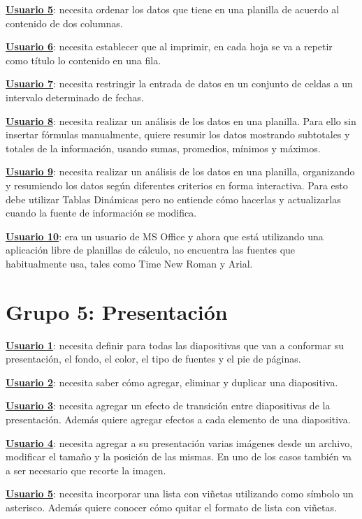 \documentclass[12pt]{article}
\begin{document}
\textbf{\underline{Usuario 5}}: necesita ordenar los datos que tiene en una planilla de acuerdo al contenido de dos columnas.

\textbf{\underline{Usuario 6}}: necesita establecer que al imprimir, en cada hoja se va a repetir como título lo contenido en una fila. 

\textbf{\underline{Usuario 7}}: necesita restringir la entrada de datos en un conjunto de celdas a un intervalo determinado de fechas.

\textbf{\underline{Usuario 8}}: necesita realizar un análisis de los datos en una planilla. Para ello sin insertar fórmulas manualmente, quiere resumir los datos mostrando subtotales y  totales de la información, usando sumas, promedios, mínimos y máximos.

\textbf{\underline{Usuario 9}}: necesita realizar un análisis de los datos en una planilla, organizando y resumiendo los datos según diferentes criterios en forma interactiva. Para esto debe utilizar Tablas Dinámicas pero no entiende cómo hacerlas y actualizarlas cuando la fuente de información se modifica.

\textbf{\underline{Usuario 10}}: era un usuario de MS Office y ahora que está utilizando una aplicación libre de planillas de cálculo, no encuentra las fuentes que habitualmente usa, tales como Time New Roman y Arial.

\section*{\textbf{Grupo 5: Presentación}}

\textbf{\underline{Usuario 1}}: necesita definir para todas las diapositivas que van a conformar su presentación, el fondo, el color, el tipo de fuentes y el pie de páginas.

\textbf{\underline{Usuario 2}}: necesita saber cómo agregar, eliminar y duplicar una diapositiva.

\textbf{\underline{Usuario 3}}: necesita agregar un efecto de transición entre diapositivas de la presentación. Además quiere agregar efectos a cada elemento de una diapositiva.

\textbf{\underline{Usuario 4}}: necesita agregar a su presentación varias imágenes desde un archivo,  modificar el tamaño y la posición de las mismas. En uno de los casos también va a ser necesario que recorte la imagen. 

\textbf{\underline{Usuario 5}}: necesita incorporar una lista con viñetas utilizando como símbolo un asterisco. Además quiere conocer cómo quitar el formato de lista con viñetas.
\end{document}
